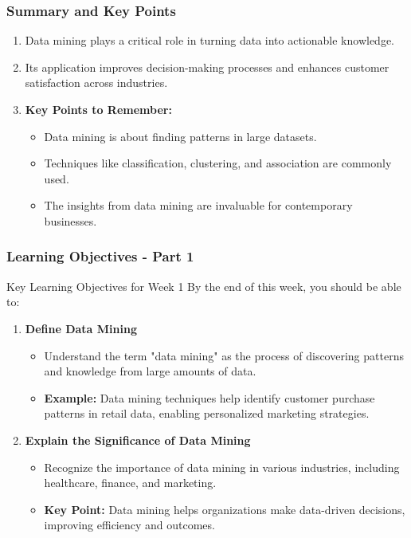 \documentclass[aspectratio=169]{beamer}
\begin{document}
\begin{frame}[fragile]
    \frametitle{Summary and Key Points}
    \begin{enumerate}
        \item Data mining plays a critical role in turning data into actionable knowledge.
        \item Its application improves decision-making processes and enhances customer satisfaction across industries.
        
        \item \textbf{Key Points to Remember:}
        \begin{itemize}
            \item Data mining is about finding patterns in large datasets.
            \item Techniques like classification, clustering, and association are commonly used.
            \item The insights from data mining are invaluable for contemporary businesses.
        \end{itemize}
    \end{enumerate}
\end{frame}

\begin{frame}[fragile]
    \frametitle{Learning Objectives - Part 1}
    \begin{block}{Key Learning Objectives for Week 1}
        By the end of this week, you should be able to:
    \end{block}
    \begin{enumerate}
        \item \textbf{Define Data Mining}
            \begin{itemize}
                \item Understand the term "data mining" as the process of discovering patterns and knowledge from large amounts of data.
                \item \textbf{Example:} Data mining techniques help identify customer purchase patterns in retail data, enabling personalized marketing strategies.
            \end{itemize}
        
        \item \textbf{Explain the Significance of Data Mining}
            \begin{itemize}
                \item Recognize the importance of data mining in various industries, including healthcare, finance, and marketing.
                \item \textbf{Key Point:} Data mining helps organizations make data-driven decisions, improving efficiency and outcomes.
            \end{itemize}
    \end{enumerate}
\end{frame}
\end{document}
